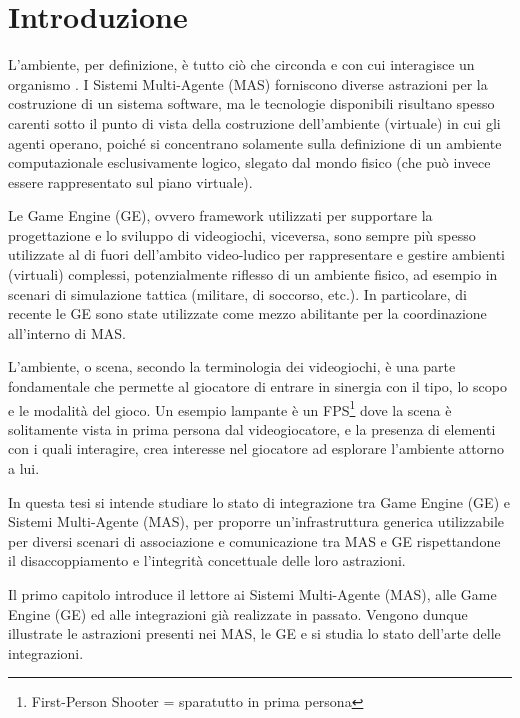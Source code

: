 \chapter{Introduzione}

L'ambiente, per definizione, è tutto ciò che circonda e con cui interagisce un organismo \cite{treccani}. I Sistemi Multi-Agente (MAS) forniscono diverse astrazioni per la costruzione di un sistema software, ma le tecnologie disponibili risultano spesso carenti sotto il punto di vista della costruzione dell'ambiente (virtuale) in cui gli agenti operano, poiché si concentrano solamente sulla definizione di un ambiente computazionale esclusivamente logico, slegato dal mondo fisico (che può invece essere rappresentato sul piano virtuale). 

\medskip

Le Game Engine (GE), ovvero framework utilizzati per supportare la progettazione e lo sviluppo di videogiochi, viceversa, sono sempre più spesso utilizzate al di fuori dell'ambito video-ludico per rappresentare e gestire ambienti (virtuali) complessi, potenzialmente riflesso di un ambiente fisico, ad esempio in scenari di simulazione tattica (militare, di soccorso, etc.). In particolare, di recente le GE sono state utilizzate come mezzo abilitante per la coordinazione \cite{gamemas-woa2016} all'interno di MAS.

\medskip 

L'ambiente, o scena, secondo la terminologia dei videogiochi, è una parte fondamentale che permette al giocatore di entrare in sinergia con il tipo, lo scopo e le modalità del gioco. Un esempio lampante è un FPS\footnote{First-Person Shooter = sparatutto in prima persona} dove la scena è solitamente vista in prima persona dal videogiocatore, e la presenza di elementi con i quali interagire, crea interesse nel giocatore ad esplorare l'ambiente attorno a lui.

\medskip

In questa tesi si intende studiare lo stato di integrazione tra Game Engine (GE) e Sistemi Multi-Agente (MAS), per proporre un'infrastruttura generica utilizzabile per diversi scenari di associazione e comunicazione tra MAS e GE rispettandone il disaccoppiamento e l'integrità concettuale delle loro astrazioni.

\medskip

Il primo capitolo introduce il lettore ai Sistemi Multi-Agente (MAS), alle Game Engine (GE) ed alle integrazioni già realizzate in passato. Vengono dunque illustrate le astrazioni presenti nei MAS, le GE e si studia lo stato dell'arte delle integrazioni.

